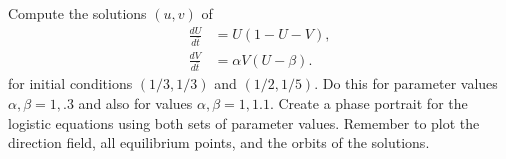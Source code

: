 \begin{problem}
Compute the solutions $(u,v)$ of 
\begin{align*}
	\frac{dU}{d\bar{t}} &= U(1-U-V),\\
	\frac{dV}{d\bar{t}} &= \alpha V (U-\beta).
\end{align*}
for initial conditions $(1/3, 1/3)$ and $(1/2, 1/5)$.
Do this for parameter values $\alpha, \beta = 1, .3$ and also for values $\alpha, \beta = 1, 1.1$.
Create a phase portrait for the logistic equations using both sets of parameter values.
Remember to plot the direction field, all equilibrium points, and the orbits of the solutions.
\end{problem}